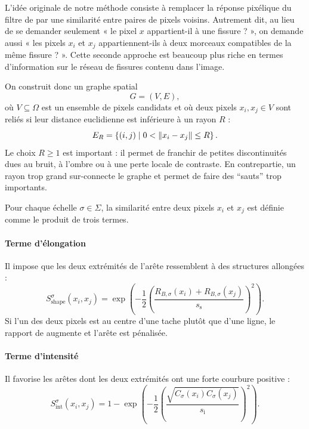 L'idée originale de notre méthode consiste à remplacer la réponse pixélique du filtre de \Frangi{} par une similarité entre paires de pixels voisins. 
Autrement dit, au lieu de se demander seulement « le pixel $x$ appartient-il à une fissure ? », on demande aussi « les pixels $x_i$ et $x_j$ appartiennent-ils à deux morceaux compatibles de la même fissure ? ».
Cette seconde approche est beaucoup plus riche en termes d'information sur le réseau de fissures contenu dans l'image.

On construit donc un graphe spatial
\[
    G=(V,E),
\]
où $V\subseteq \Omega$ est un ensemble de pixels candidats et où deux pixels $x_i,x_j\in V$ sont reliés si leur distance euclidienne est inférieure à un rayon $R$ :
\begin{equation}
    E_R
    =
    \left\{(i,j) \;\middle|\; 0 < \lVert x_i-x_j \rVert \le R \right\}.
    \label{eq:chapIII_edges_radius}
\end{equation}
Le choix $R\ge1$ est important : il permet de franchir de petites discontinuités dues au bruit, à l'ombre ou à une perte locale de contraste. En contrepartie, un rayon trop grand sur-connecte le graphe et permet de faire des ``sauts'' trop importants. 

Pour chaque échelle $\sigma\in\Sigma$, la similarité entre deux pixels $x_i$ et $x_j$ est définie comme le produit de trois termes.

\paragraph{Terme d'élongation}
Il impose que les deux extrémités de l'arête ressemblent à des structures allongées :
\begin{equation}
    S_{\mathrm{shape}}^\sigma(x_i,x_j)
    =
    \exp\left(
        -\frac12
        \left(
            \frac{R_{B,\sigma}(x_i)+R_{B,\sigma}(x_j)}{s_{\mathrm{s}}}
        \right)^2
    \right).
    \label{eq:chapIII_shape}
\end{equation}
Si l'un des deux pixels est au centre d'une tache plutôt que d'une ligne, le rapport de \Frangi{} augmente et l'arête est pénalisée.

\paragraph{Terme d'intensité}
Il favorise les arêtes dont les deux extrémités ont une forte courbure positive :
\begin{equation}
    S_{\mathrm{int}}^\sigma(x_i,x_j)
    =
    1-
    \exp\left(
        -\frac12
        \left(
            \frac{\sqrt{C_\sigma(x_i)C_\sigma(x_j)}}{s_{\mathrm{i}}}
        \right)^2
    \right).
    \label{eq:chapIII_int}
\end{equation}


